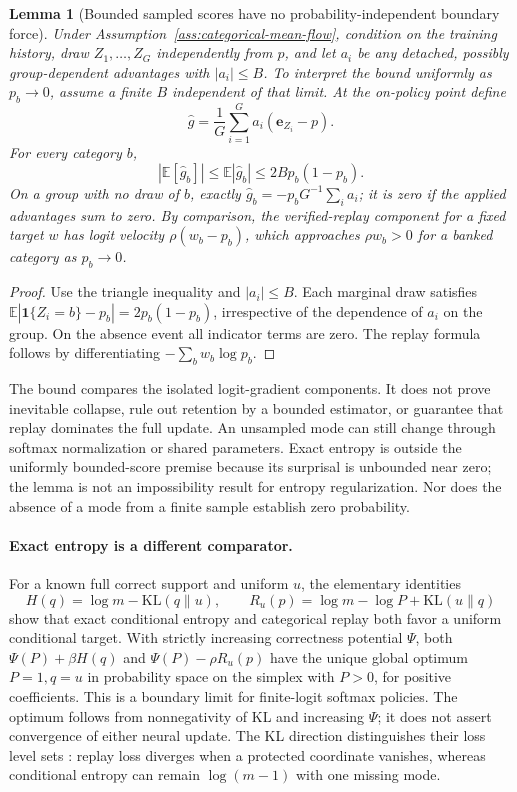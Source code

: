 \documentclass{article}
\newcommand{\1}{\mathbf 1}
\newcommand{\E}{\mathbb E}
\newtheorem{lemma}{Lemma}[section]
\theoremstyle{remark}
\theoremstyle{definition}
\theoremstyle{plain}
\begin{document}
\begin{lemma}[Bounded sampled scores have no probability-independent boundary force]
\label{lem:sampled-score-bound}
Under Assumption~\ref{ass:categorical-mean-flow}, condition on the training history, draw
$Z_1,\ldots,Z_G$ independently from $p$, and let $a_i$ be any detached,
possibly group-dependent advantages with $|a_i|\le B$. To interpret the
bound uniformly as $p_b\to0$, assume a finite $B$ independent of that limit.
At the on-policy point define
\[
 \widehat g=\frac1G\sum_{i=1}^G a_i(\mathbf e_{Z_i}-p).
\]
For every category $b$,
\[
 |\E[\widehat g_b]|\le\E|\widehat g_b|
 \le 2B p_b(1-p_b).
\]
On a group with no draw of $b$, exactly
$\widehat g_b=-p_bG^{-1}\sum_i a_i$; it is zero if the applied advantages
sum to zero. By comparison, the verified-replay component for a fixed target
$w$ has logit velocity $\rho(w_b-p_b)$, which approaches $\rho w_b>0$
for a banked category as $p_b\to0$.
\end{lemma}

\begin{proof}
Use the triangle inequality and $|a_i|\le B$. Each marginal draw satisfies
$\E|\1\{Z_i=b\}-p_b|=2p_b(1-p_b)$, irrespective of the dependence of
$a_i$ on the group. On the absence event all indicator terms are zero.
The replay formula follows by differentiating $-\sum_b w_b\log p_b$.
\end{proof}

The bound compares the isolated logit-gradient components. It does not prove
inevitable collapse, rule out retention by a bounded estimator, or guarantee
that replay dominates the full update. An unsampled mode can still change
through softmax normalization or shared parameters. Exact entropy is outside
the uniformly bounded-score premise because its surprisal is unbounded near
zero; the lemma is not an impossibility result for entropy regularization.
Nor does the absence of a mode from a finite sample establish zero probability.

\paragraph{Exact entropy is a different comparator.}
For a known full correct support and uniform $u$, the elementary identities
\[
 H(q)=\log m-\mathrm{KL}(q\|u),\qquad
 R_u(p)=\log m-\log P+\mathrm{KL}(u\|q)
\]
show that exact conditional entropy and categorical replay both favor a
uniform conditional target. With strictly increasing correctness potential
$\Psi$, both $\Psi(P)+\beta H(q)$ and $\Psi(P)-\rho R_u(p)$ have the unique
global optimum $P=1,q=u$ in probability space on the simplex with $P>0$,
for positive coefficients. This is a boundary limit for finite-logit softmax
policies. The optimum follows from nonnegativity of KL and increasing
$\Psi$; it does not assert convergence of either neural update. The KL direction distinguishes their
loss level sets \citep{pereyra2017confidencepenalty,agarwal2021policygradient}:
replay loss diverges when a protected coordinate vanishes, whereas
conditional entropy can remain $\log(m-1)$ with one missing mode.
\end{document}
